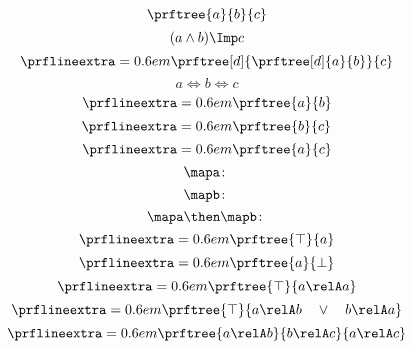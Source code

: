 {\begin{forslides}
\begin{equation*}
        \prftree{a}{b}{c}
\end{equation*}
        \begin{equation*}
        \label{eq:abc_4}
        (a\wedge b)\Imp c
\end{equation*}
\begin{equation*}
    \label{eq:abc_5}
    \prflineextra=0.6em
    \prftree[d]
    {\prftree[d]
    {a}
      {b}}
    {c}
\end{equation*}
\begin{equation*}
    \label{eq:abc_6}
    a\Leftrightarrow b \Leftrightarrow c
\end{equation*}
    \begin{equation*}
    \label{eq:abc_7}
    \prflineextra=0.6em
    \prftree{a}{b}
\end{equation*}
        \begin{equation*}
    \label{eq:abc_8}
    \prflineextra=0.6em
    \prftree{b}{c}
\end{equation*}
            \begin{equation*}
    \label{eq:abc_9}
    \prflineextra=0.6em
    \prftree{a}{c}
\end{equation*}
\begin{equation*}
    \label{eq:mapf}
    \mapa \colon
\end{equation*}
\begin{equation*}
    \label{eq:mapg}
    \mapb \colon
\end{equation*}
\begin{equation*}
    \label{eq:mapcomp}
    \mapa \then \mapb \colon
\end{equation*}
\begin{equation*}
    \label{eq:top1}
    \prflineextra=0.6em
    \prftree{\top}{a}
\end{equation*}
\begin{equation*}
    \label{eq:bot1}
    \prflineextra=0.6em
    \prftree{a}{\bot}
\end{equation*}
\begin{equation*}
    \label{eq:rel_refl}
    \prflineextra=0.6em
    \prftree{\top}{a\relA a}
\end{equation*}
\begin{equation*}
    \label{eq:rel_tot}
    \prflineextra=0.6em
    \prftree{\top}{a\relA b \quad \vee \quad b\relA a}
\end{equation*}
\begin{equation*}
    \label{eq:rel_tran}
    \prflineextra=0.6em
    \prftree{a\relA b}{b\relA c}{a\relA c}
\end{equation*}

\end{forslides}}
